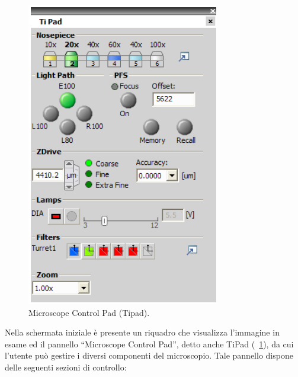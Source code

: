 \begin{figure}
 \centering
 \includegraphics[scale=.50]{img/CAP2pannello.png}
 \caption{\small{Microscope Control Pad (Tipad).}}
 \label{fig:pannello}
\end{figure}

Nella schermata iniziale è presente un riquadro che visualizza l'immagine in esame ed il pannello ``Microscope Control Pad'', detto anche TiPad (\figurename~\ref{fig:pannello}), da cui l'utente può gestire i diversi componenti del microscopio. 
Tale pannello dispone delle seguenti sezioni di controllo:

